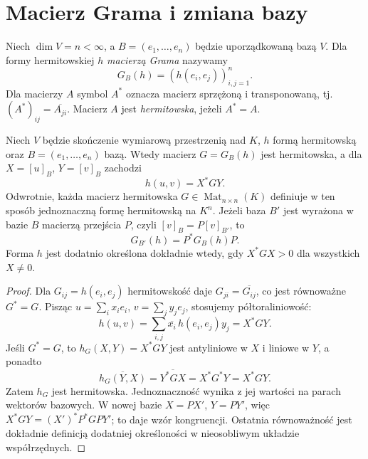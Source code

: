 \section{Macierz Grama i zmiana bazy}
\label{sec:lin12-gram}

\begin{definicja}
\label{def:lin12-gram}
Niech \(\dim V=n<\infty\), a
\(B=(e_1,\ldots,e_n)\) będzie
uporządkowaną bazą \(V\).
Dla formy hermitowskiej \(h\)
\emph{macierzą Grama} nazywamy
\[
 G_B(h)=(h(e_i,e_j))_{i,j=1}^{n}.
\]
Dla macierzy \(A\) symbol \(A^*\)
oznacza macierz sprzężoną i transponowaną,
tj. \((A^*)_{ij}=\overline{A_{ji}}\).
Macierz \(A\) jest \emph{hermitowska},
jeżeli \(A^*=A\).
\end{definicja}

\begin{twierdzenie}
\label{thm:lin12-gram-zmiana}
Niech \(V\) będzie skończenie wymiarową
przestrzenią nad \(K\),
\(h\) formą hermitowską oraz
\(B=(e_1,\ldots,e_n)\) bazą.
Wtedy macierz \(G=G_B(h)\)
jest hermitowska, a dla
\(X=[u]_B\), \(Y=[v]_B\) zachodzi
\[
 h(u,v)=X^*GY.
\]
Odwrotnie, każda macierz hermitowska
\(G\in\operatorname{Mat}_{n\times n}(K)\)
definiuje w ten sposób jednoznaczną
formę hermitowską na \(K^n\).
Jeżeli baza \(B'\) jest wyrażona
w bazie \(B\) macierzą przejścia \(P\),
czyli \([v]_B=P[v]_{B'}\), to
\[
 G_{B'}(h)=P^*G_B(h)P.
\]
Forma \(h\) jest dodatnio określona
dokładnie wtedy, gdy
\(X^*GX>0\) dla wszystkich \(X\ne0\).
\end{twierdzenie}
\begin{proof}
Dla \(G_{ij}=h(e_i,e_j)\)
hermitowskość daje
\(G_{ji}=\overline{G_{ij}}\),
co jest równoważne \(G^*=G\).
Pisząc
\(u=\sum_i x_ie_i\), \(v=\sum_j y_je_j\),
stosujemy półtoraliniowość:
\[
 h(u,v)=\sum_{i,j}\overline{x_i}\,
         h(e_i,e_j)y_j=X^*GY.
\]
Jeśli \(G^*=G\), to
\(h_G(X,Y)=X^*GY\)
jest antyliniowe w \(X\)
i liniowe w \(Y\), a ponadto
\[
 \overline{h_G(Y,X)}
 =\overline{Y^*GX}
 =X^*G^*Y=X^*GY.
\]
Zatem \(h_G\) jest hermitowska.
Jednoznaczność wynika z jej wartości
na parach wektorów bazowych.
W nowej bazie
\(X=P X'\), \(Y=P Y'\),
więc
\(X^*GY=(X')^*P^*GPY'\);
to daje wzór kongruencji.
Ostatnia równoważność jest dokładnie
definicją dodatniej określoności
w nieosobliwym układzie współrzędnych.
\end{proof}

